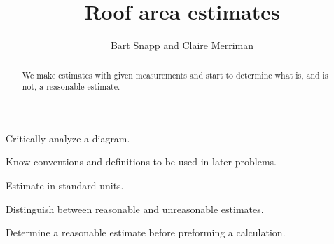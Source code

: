 \documentclass[handout,nooutcomes,noauthor,hints]{ximera}
\title{Roof area estimates}
\author{Bart Snapp and Claire Merriman}
\begin{document}
\begin{abstract}
 We make estimates with given measurements and start to determine what
 is, and is not, a reasonable estimate.
\end{abstract}
\maketitle

\begin{listOutcomes}
\item Critically analyze a diagram.
\item Know conventions and definitions to be used in later problems.
\item Estimate in standard units.
\item Distinguish between reasonable and unreasonable estimates.
\item Determine a reasonable estimate before preforming a calculation.
\end{listOutcomes}
\end{document}
